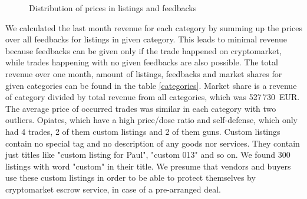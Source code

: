 \documentclass[
  digital, %
  table,   %
  lof,     %
  lot,     %
  oneside
]{fithesis3}
\begin{document}
\begin{figure}[!htb]
    
\caption{Distribution of prices in listings and feedbacks}
\label{listingxprice}
\label{flistingxprice}
\end{figure}

We calculated the last month revenue for each category
by summing up the prices over all feedbacks for listings in given category.
This leads to minimal revenue because feedbacks
can be given only if the trade happened on cryptomarket, while 
trades happening with no given feedbacks are also possible.
The total revenue over one month, amount of listings, feedbacks and market shares for given categories 
can be found in the table \ref{categories}.
Market share is a revenue of category divided by total revenue from all categories, which was 527\,730~EUR.
The average price of occurred trades was similar in each category
with two outliers. Opiates, which have a high price/dose ratio and self-defense, which only had 4 trades, 2 of them custom listings and 2 of them guns.
Custom listings contain no special tag and no description of any goods nor services.
They contain just titles like "custom listing for Paul", "custom 013" and so on.
We found 300 listings with word "custom" in their title. 
We presume that vendors and buyers use these custom listings in order to be able to protect themselves
by cryptomarket escrow service, in case of a pre-arranged deal.
\end{document}
